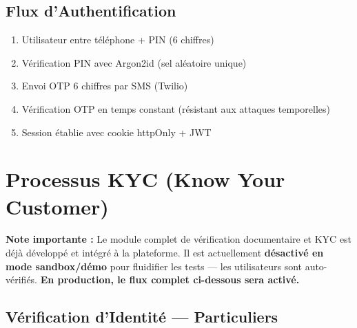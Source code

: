 \documentclass[11pt,a4paper]{article}
\begin{document}
\subsection{Flux d'Authentification}

\begin{enumerate}[leftmargin=*]
    \item Utilisateur entre t\'el\'ephone + PIN (6 chiffres)
    \item V\'erification PIN avec Argon2id (sel al\'eatoire unique)
    \item Envoi OTP 6 chiffres par SMS (Twilio)
    \item V\'erification OTP en temps constant (r\'esistant aux attaques temporelles)
    \item Session \'etablie avec cookie httpOnly + JWT
\end{enumerate}

\newpage

\section{Processus KYC (Know Your Customer)}

\textbf{Note importante :} Le module complet de v\'erification documentaire et KYC est d\'ej\`a d\'evelopp\'e et int\'egr\'e \`a la plateforme. Il est actuellement \textbf{d\'esactiv\'e en mode sandbox/d\'emo} pour fluidifier les tests --- les utilisateurs sont auto-v\'erifi\'es. \textbf{En production, le flux complet ci-dessous sera activ\'e.}

\subsection{V\'erification d'Identit\'e --- Particuliers}
\end{document}
